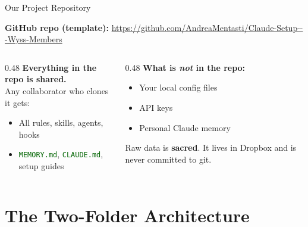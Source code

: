 \documentclass[aspectratio=169,11pt,dvipsnames]{beamer}
\newcommand{\file}[1]{\textcolor{darkgreen}{\nolinkurl{#1}}}
\begin{document}
\begin{frame}{Our Project Repository}
  \begin{center}
    \textbf{GitHub repo (template):}
    \url{https://github.com/AndreaMentasti/Claude-Setup---Wyss-Members}
  \end{center}
  \vspace{0.3cm}
  \begin{columns}[T]
    \begin{column}{0.48\textwidth}
      \textbf{Everything in the repo is shared.}\\[0.2cm]
      Any collaborator who clones it gets:
      \begin{itemize}
        \item All rules, skills, agents, hooks
        \item \file{MEMORY.md}, \file{CLAUDE.md}, setup guides
      \end{itemize}
    \end{column}
    \begin{column}{0.48\textwidth}
      \textbf{What is \emph{not} in the repo:}
      \begin{itemize}
        \item Your local config files
        \item API keys
        \item Personal Claude memory
      \end{itemize}
      \vspace{0.2cm}
      \begin{alertbox}[title=Rule 1]
        \small Raw data is \textbf{sacred}. It lives in Dropbox
        and is never committed to git.
      \end{alertbox}
    \end{column}
  \end{columns}
\end{frame}

\section{The Two-Folder Architecture}
\end{document}

